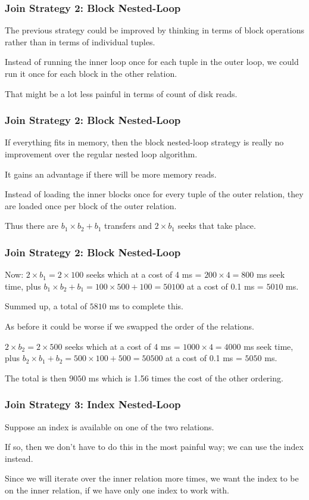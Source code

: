 \begin{frame}
\frametitle{Join Strategy 2: Block Nested-Loop}

The previous strategy could be improved by thinking in terms of block operations rather than in terms of individual tuples. 

Instead of running the inner loop once for each tuple in the outer loop, we could run it once for each block in the other relation. 

That might be a lot less painful in terms of count of disk reads. 

\end{frame}

\begin{frame}
\frametitle{Join Strategy 2: Block Nested-Loop}

If everything fits in memory, then the block nested-loop strategy is really no improvement over the regular nested loop algorithm. 

It gains an advantage if there will be more memory reads. 

Instead of loading the inner blocks once for every tuple of the outer relation, they are loaded once per block of the outer relation.

Thus there are $b_{1} \times b_{2} + b_{1}$ transfers and $2\times b_{1}$ seeks that take place.

\end{frame}

\begin{frame}
\frametitle{Join Strategy 2: Block Nested-Loop}

Now: $2 \times b_{1} = 2 \times 100 $ seeks which at a cost of 4 ms = $200 \times 4 = 800$ ms seek time, plus $b_{1} \times b_{2} + b_{1} = 100 \times 500 + 100 = 50100$ at a cost of 0.1 ms = $5010$ ms. 

Summed up, a total of $5810$ ms to complete this.

As before it could be worse if we swapped the order of the relations. 

$2 \times b_{2} = 2 \times 500 $ seeks which at a cost of 4 ms = $1000 \times 4 = 4000$ ms seek time, plus $b_{2} \times b_{1} + b_{2} = 500 \times 100 + 500 = 50500$ at a cost of 0.1 ms = $5050$ ms. 

The total is then $9050$ ms which is 1.56 times the cost of the other ordering.

\end{frame}

\begin{frame}
\frametitle{Join Strategy 3: Index Nested-Loop}

Suppose an index is available on one of the two relations. 

If so, then we don't have to do this in the most painful way; we can use the index instead.

 Since we will iterate over the inner relation more times, we want the index to be on the inner relation, if we have only one index to work with.

\end{frame}

